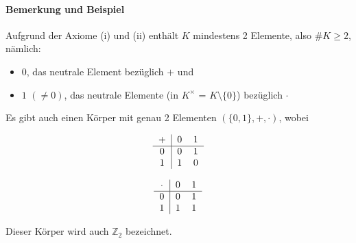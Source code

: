  	\paragraph{Bemerkung und Beispiel}
 		Aufgrund der Axiome (i) und (ii) enthält $ K $ mindestens 2 Elemente, also $ \# K \geq 2 $, nämlich:
 		\begin{itemize}
 			\item $ 0 $, das neutrale Element bezüglich $+$ und
 			\item $1$ $(\neq 0)$, das neutrale Elemente (in $K^\times$ = $K\setminus\{0\}$) bezüglich $\cdot$
 		\end{itemize}
 		Es gibt auch einen Körper mit genau 2 Elementen $(\{0,1\},+,\cdot)$, wobei

 		\begin{minipage}{0.45\textwidth}
 			\begin{equation*}
 				\begin{tabular}{c|cc}
 					$+$ & 0 & 1 \\\hline
 					0   & 0 & 1 \\
 					1   & 1 & 0 \\
 				\end{tabular}
 			\end{equation*}
 		\end{minipage}
 		\begin{minipage}{0.45\textwidth}
 			\begin{equation*}
 				\begin{tabular}{c|cc}
 					$\cdot$ & 0 & 1 \\\hline
 					0       & 0 & 1 \\
 					1       & 1 & 1 \\
 				\end{tabular}
 			\end{equation*}
 		\end{minipage}

 		Dieser Körper wird auch $\mathbb{Z}_2$ bezeichnet.

